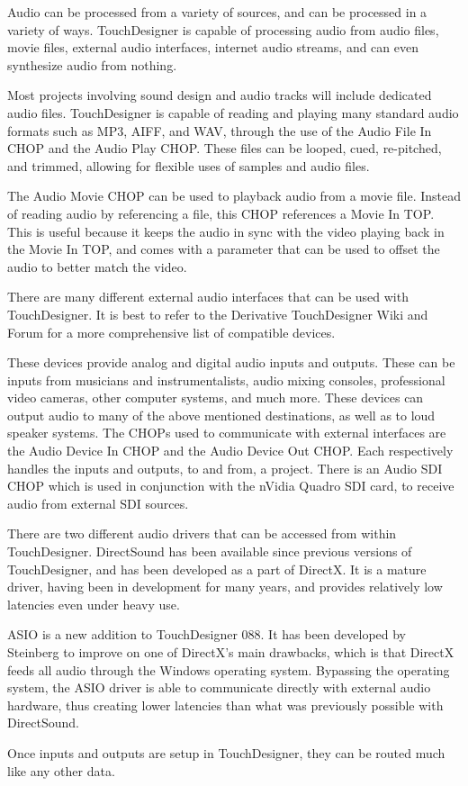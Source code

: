 \begin{fullwidth}
Audio can be processed from a variety of sources, and can be processed in a variety of ways. TouchDesigner is capable of processing audio from audio files, movie files, external audio interfaces, internet audio streams, and can even synthesize audio from nothing. 

Most projects involving sound design and audio tracks will include dedicated audio files. TouchDesigner is capable of reading and playing many standard audio formats such as MP3, AIFF, and WAV, through the use of the Audio File In CHOP and the Audio Play CHOP. These files can be looped, cued, re-pitched, and trimmed, allowing for flexible uses of samples and audio files.

The Audio Movie CHOP can be used to playback audio from a movie file. Instead of reading audio by referencing a file, this CHOP references a Movie In TOP. This is useful because it keeps the audio in sync with the video playing back in the Movie In TOP, and comes with a parameter that can be used to offset the audio to better match the video.

There are many different external audio interfaces that can be used with TouchDesigner. It is best to refer to the Derivative TouchDesigner Wiki and Forum for a more comprehensive list of compatible devices. 

These devices provide analog and digital audio inputs and outputs. These can be inputs from musicians and instrumentalists, audio mixing consoles, professional video cameras, other computer systems, and much more. These devices can output audio to many of the above mentioned destinations, as well as to loud speaker systems. The CHOPs used to communicate with external interfaces are the Audio Device In CHOP and the Audio Device Out CHOP. Each respectively handles the inputs and outputs, to and from, a project. There is an Audio SDI CHOP which is used in conjunction with the nVidia Quadro SDI card, to receive audio from external SDI sources. 

There are two different audio drivers that can be accessed from within TouchDesigner. DirectSound has been available since previous versions of TouchDesigner, and has been developed as a part of DirectX. It is a mature driver, having been in development for many years, and provides relatively low latencies even under heavy use. 

ASIO is a new addition to TouchDesigner 088. It has been developed by Steinberg to improve on one of DirectX's main drawbacks, which is that DirectX feeds all audio through the Windows operating system. Bypassing the operating system, the ASIO driver is able to communicate directly with external audio hardware, thus creating lower latencies than what was previously possible with DirectSound.

Once inputs and outputs are setup in TouchDesigner, they can be routed much like any other data. 

\end{fullwidth}

